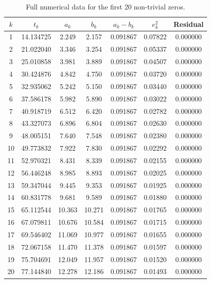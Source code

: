 \documentclass[12pt,a4paper]{article}
\theoremstyle{definition}
\begin{document}
\begin{table}[H]
\centering
\caption{Full numerical data for the first 20 non-trivial zeros.}
\begin{tabular}{c|c|c|c|c|c|c}
\hline
$k$ & $t_k$ & $a_k$ & $b_k$ & $a_k-b_k$ & $e_k^2$ & Residual \\
\hline
1 & 14.134725 & 2.249 & 2.157 & 0.091867 & 0.07822 & 0.000000 \\
2 & 21.022040 & 3.346 & 3.254 & 0.091867 & 0.05337 & 0.000000 \\
3 & 25.010858 & 3.981 & 3.889 & 0.091867 & 0.04507 & 0.000000 \\
4 & 30.424876 & 4.842 & 4.750 & 0.091867 & 0.03720 & 0.000000 \\
5 & 32.935062 & 5.242 & 5.150 & 0.091867 & 0.03440 & 0.000000 \\
6 & 37.586178 & 5.982 & 5.890 & 0.091867 & 0.03022 & 0.000000 \\
7 & 40.918719 & 6.512 & 6.420 & 0.091867 & 0.02782 & 0.000000 \\
8 & 43.327073 & 6.896 & 6.804 & 0.091867 & 0.02630 & 0.000000 \\
9 & 48.005151 & 7.640 & 7.548 & 0.091867 & 0.02380 & 0.000000 \\
10 & 49.773832 & 7.922 & 7.830 & 0.091867 & 0.02292 & 0.000000 \\
11 & 52.970321 & 8.431 & 8.339 & 0.091867 & 0.02155 & 0.000000 \\
12 & 56.446248 & 8.985 & 8.893 & 0.091867 & 0.02025 & 0.000000 \\
13 & 59.347044 & 9.445 & 9.353 & 0.091867 & 0.01925 & 0.000000 \\
14 & 60.831778 & 9.681 & 9.589 & 0.091867 & 0.01880 & 0.000000 \\
15 & 65.112544 & 10.363 & 10.271 & 0.091867 & 0.01765 & 0.000000 \\
16 & 67.079811 & 10.676 & 10.584 & 0.091867 & 0.01715 & 0.000000 \\
17 & 69.546402 & 11.069 & 10.977 & 0.091867 & 0.01655 & 0.000000 \\
18 & 72.067158 & 11.470 & 11.378 & 0.091867 & 0.01597 & 0.000000 \\
19 & 75.704691 & 12.049 & 11.957 & 0.091867 & 0.01520 & 0.000000 \\
20 & 77.144840 & 12.278 & 12.186 & 0.091867 & 0.01493 & 0.000000 \\
\hline
\end{tabular}
\label{tab:full_data}
\end{table}
\end{document}
